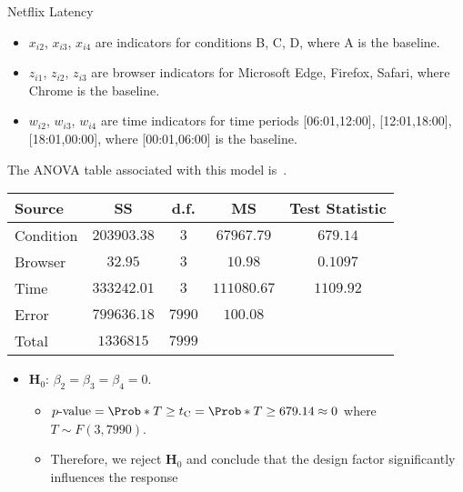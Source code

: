 \begin{Example}{Netflix Latency}{}
      \begin{itemize}
            \item $ x_{i2} $, $ x_{i3} $, $ x_{i4} $ are indicators for conditions B, C, D, where A is the baseline.
            \item $ z_{i1} $, $ z_{i2} $, $ z_{i3} $ are browser indicators for Microsoft Edge, Firefox, Safari, where Chrome is the baseline.
            \item $ w_{i2} $, $ w_{i3} $, $ w_{i4} $ are time indicators for time periods [06:01,12:00], [12:01,18:00], [18:01,00:00], where [00:01,06:00] is the baseline.
      \end{itemize}
      The ANOVA table associated with this model is~.
      \begin{center}
            \captionsetup{type=table}\label{netflixex2}
            \begin{NiceTabular}{|l|c|c|c|c|}
                  \toprule
                  Source    & SS                     & d.f.        & MS                                                                   & Test Statistic                                           \\
                  \midrule
                  Condition & $ 203903.38 $ & $ 3 $     & $ 67967.79 $     & $ 679.14 $ \\
                  Browser     & $ 32.95 $ & $ 3 $     & $ 10.98 $     & $ 0.1097 $ \\
                  Time     & $ 333242.01 $ & $ 3 $     & $ 111080.67 $     & $ 1109.92 $ \\
                  Error     & $ 799636.18 $ & $ 7990 $ & $ 100.08 $ &                                                      \\
                  \midrule
                  Total     & $ 1336815 $ & $ 7999 $\\
                  \bottomrule
            \end{NiceTabular}
      \end{center}
      \begin{itemize}
            \item $ \mathbf{H}_0 $: $ \beta_2=\beta_3=\beta_4=0 $.
                  \begin{itemize}
                        \item $ p\text{-value}=\Prob*{T\ge t_\text{C}}=\Prob*{T\ge 679.14}\approx 0 $ where $ T \sim F(3,7990) $.
                        \item Therefore, we reject $ \mathbf{H}_0 $ and conclude that the design factor significantly influences the response

\end{itemize}
\end{itemize}
\end{Example}
